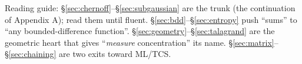 \documentclass[cjk]{loom}   %
\begin{document}
\begin{strand}
Reading guide: §\ref{sec:chernoff}–§\ref{sec:subgaussian} are the trunk (the
continuation of Appendix A); read them until fluent. §\ref{sec:bdd}–§\ref{sec:entropy}
push ``sums'' to ``any bounded-difference function''.
§\ref{sec:geometry}–§\ref{sec:talagrand} are the geometric heart that gives
``\emph{measure} concentration'' its name. §\ref{sec:matrix}–§\ref{sec:chaining}
are two exits toward ML/TCS.
\end{strand}

\clearpage
{\small\tableofcontents}

\clearpage









\end{document}
